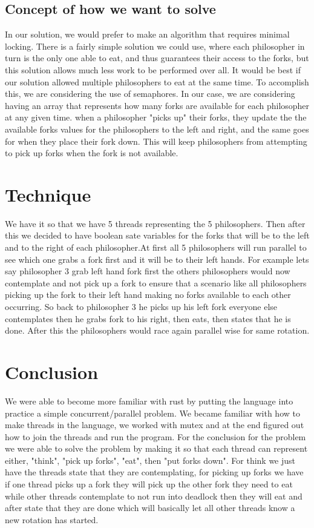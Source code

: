 \documentclass[conference]{IEEEtran}
\begin{document}
	\subsection*{Concept of how we want to solve}
	In our solution, we would prefer to make an algorithm that requires minimal locking. There is a fairly simple solution we could use, where each philosopher in turn is the only one able to eat, and thus guarantees their access to the forks, but this solution allows much less work to be performed over all. It would be best if our solution allowed multiple philosophers to eat at the same time. To accomplish this, we are considering the use of semaphores. In our case, we are considering having an array that represents how many forks are available for each philosopher at any given time. when a philosopher "picks up" their forks, they update the the available forks values for the philosophers to the left and right, and the same goes for when they place their fork down. This will keep philosophers from attempting to pick up forks when the fork is not available. 
	\section{Technique}
	We have it so that we have 5 threads representing the 5 philosophers. Then after this we decided to have boolean sate variables for the forks that will be to the left and to the right of each philosopher.At first all 5 philosophers will run parallel to see which one grabs a fork first and it will be to their left hands. For example lets say philosopher 3 grab left hand fork first the others philosophers would now contemplate and not pick up a fork to ensure that a scenario like all philosophers picking up the fork to their left hand making no forks available to each other occurring. So back to philosopher 3 he picks up his left fork everyone else contemplates then he grabs fork to his right, then eats, then states that he is done. After this the philosophers would race again parallel wise for same rotation.
	\section{Conclusion}
	We were able to become more familiar with rust by putting the language into practice a simple concurrent/parallel problem. We became familiar with how to make threads in the language, we worked with mutex and  at the end figured out how to join the threads and run the program. 
	\linebreak
	For the conclusion for the problem we were able to solve the problem by making it so that each thread can represent either, "think", "pick up forks", "eat", then "put forks down". For think we just have the threads state that they are contemplating, for picking up forks we have if one thread picks up a fork they will pick up the other fork they need to eat while other threads contemplate to not run into deadlock then they will eat and after state that they are done which will basically let all other threads know a new rotation has started.

	\pagebreak
	
	
\end{document}
